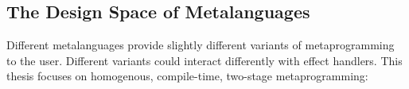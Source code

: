 
\subsection{The Design Space of Metalanguages}\label{subsection:metaprogramming-design}
Different metalanguages provide slightly different variants of metaprogramming to the user. Different variants could interact differently with effect handlers. This thesis focuses on homogenous, compile-time, two-stage metaprogramming: 


